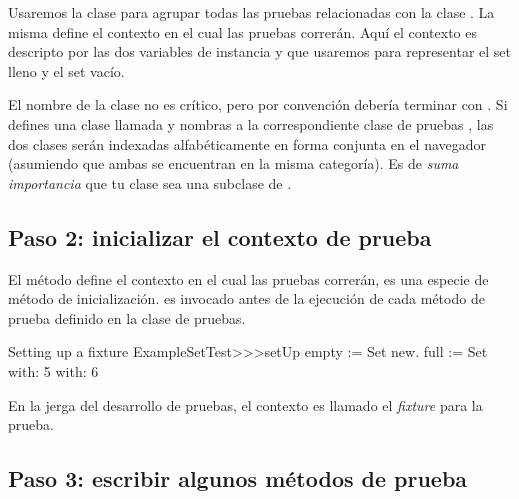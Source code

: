 \documentclass[a4paper,10pt,twoside]{book}
\begin{document}
Usaremos la clase  para agrupar todas las pruebas relacionadas con
la clase .  La misma define el contexto en el cual las pruebas
correr\'an. Aqu\'i el contexto es descripto por las dos variables de instancia  y 
que usaremos para representar el set lleno y el set vac\'io.

El nombre de la clase no es cr\'itico, pero por convenci\'on deber\'ia terminar con .
Si defines una clase llamada  y nombras a la correspondiente clase de pruebas ,
las dos clases ser\'an indexadas alfab\'eticamente en forma conjunta en el navegador (asumiendo
que ambas se encuentran en la misma categor\'ia).  Es de \emph{suma importancia} que tu clase 
sea una subclase de .

\subsection{Paso 2: inicializar el contexto de prueba}

El m\'etodo  define el contexto en el cual las
pruebas correr\'an, es una especie de m\'etodo de inicializaci\'on.
 es invocado antes de la ejecuci\'on de cada m\'etodo de prueba definido
en la clase de pruebas.




\begin{method}[setupExampleSetTest]{Setting up a fixture}
ExampleSetTest>>>setUp
	empty := Set new.
	full := Set with: 5 with: 6
\end{method}

\noindent
En la jerga del desarrollo de pruebas, el contexto es llamado el \emph{fixture} para la prueba.


\subsection{Paso 3: escribir algunos m\'etodos de prueba}
\end{document}
